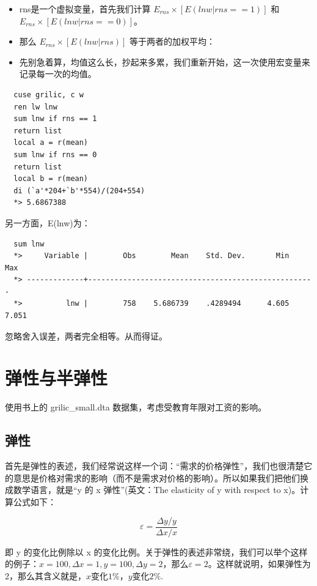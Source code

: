 \documentclass[cn,fancy,blue,11pt]{elegantbook}
\begin{document}
\begin{itemize}
\item  rns是一个虚拟变量，首先我们计算 \(E_{rns} \times [E(lnw|rns==1)]\) 和 \(E_{rns} \times [E(lnw|rns==0)]\)。
\item  那么 \(E_{rns} \times [E(lnw|rns)]\) 等于两者的加权平均：
\item  先别急着算，均值这么长，抄起来多累，我们重新开始，这一次使用宏变量来记录每一次的均值。
\end{itemize}

\begin{lstlisting}
  cuse grilic, c w
  ren lw lnw
  sum lnw if rns == 1
  return list
  local a = r(mean)
  sum lnw if rns == 0
  return list
  local b = r(mean)
  di (`a'*204+`b'*554)/(204+554)
  *> 5.6867388
\end{lstlisting}

另一方面，E(lnw)为：

\begin{lstlisting}
  sum lnw
  *>     Variable |        Obs        Mean    Std. Dev.       Min        Max
  *> -------------+----------------------------------------------------
  *>          lnw |        758    5.686739    .4289494      4.605      7.051
\end{lstlisting}

忽略舍入误差，两者完全相等。从而得证。

\hypertarget{section-23}{%
\chapter{弹性与半弹性}\label{section-23}}

使用书上的 grilic\_small.dta 数据集，考虑受教育年限对工资的影响。

\hypertarget{section-24}{%
\section{弹性}\label{section-24}}

首先是弹性的表述，我们经常说这样一个词：``需求的价格弹性''，我们也很清楚它的意思是价格对需求的影响（而不是需求对价格的影响）。所以如果我们把他们换成数学语言，就是``y 的 x 弹性''(英文：The elasticity of y with respect to x)。计算公式如下：

\begin{equation}
  \varepsilon  = \frac{\Delta y / y}{\Delta x / x}
\end{equation}

即 y 的变化比例除以 x 的变化比例。关于弹性的表述非常绕，我们可以举个这样的例子：\(x = 100, \Delta x = 1, y = 100, \Delta y = 2\)，那么\(\varepsilon = 2\)。这样就说明，如果弹性为 2，那么其含义就是，\(x\)变化\(1\%\)，\(y\)变化\(2\%\).
\end{document}
